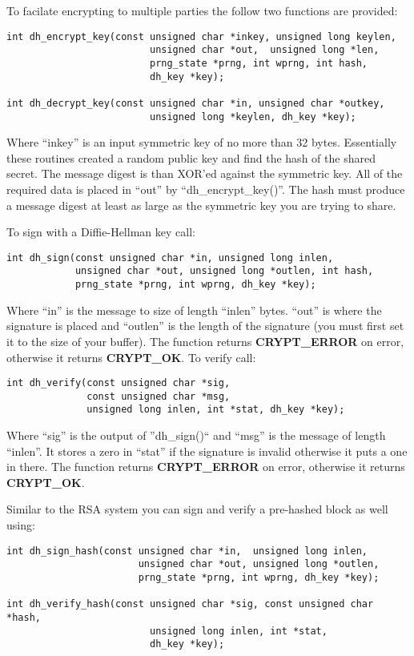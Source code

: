 \documentclass{book}
\begin{document}
To facilate encrypting to multiple parties the follow two functions are provided:
\begin{verbatim}
int dh_encrypt_key(const unsigned char *inkey, unsigned long keylen,
                         unsigned char *out,  unsigned long *len, 
                         prng_state *prng, int wprng, int hash, 
                         dh_key *key);

int dh_decrypt_key(const unsigned char *in, unsigned char *outkey, 
                         unsigned long *keylen, dh_key *key);
\end{verbatim}
Where ``inkey'' is an input symmetric key of no more than 32 bytes.  Essentially these routines created a random public key
and find the hash of the shared secret.  The message digest is than XOR'ed against the symmetric key.  All of the required
data is placed in ``out'' by ``dh\_encrypt\_key()''.   The hash must produce a message digest at least as large
as the symmetric key you are trying to share.

To sign with a Diffie-Hellman key call:
\begin{verbatim}
int dh_sign(const unsigned char *in, unsigned long inlen, 
            unsigned char *out, unsigned long *outlen, int hash, 
            prng_state *prng, int wprng, dh_key *key);
\end{verbatim}
Where ``in'' is the message to size of length ``inlen'' bytes.  ``out'' is where the signature is placed and ``outlen''
is the length of the signature (you must first set it to the size of your buffer).  The function returns {\bf CRYPT\_ERROR} on error, otherwise
it returns {\bf CRYPT\_OK}.  To verify call:
\begin{verbatim}
int dh_verify(const unsigned char *sig, 
              const unsigned char *msg, 
              unsigned long inlen, int *stat, dh_key *key);
\end{verbatim}
Where ``sig'' is the output of ''dh\_sign()`` and ``msg'' is the message of length ``inlen''.  It stores a zero in ``stat''
if the signature is invalid otherwise it puts a one in there.  The function returns {\bf CRYPT\_ERROR} on error, otherwise
it returns {\bf CRYPT\_OK}.

Similar to the RSA system you can sign and verify a pre-hashed block as well using:
\begin{verbatim}
int dh_sign_hash(const unsigned char *in,  unsigned long inlen,
                       unsigned char *out, unsigned long *outlen,
                       prng_state *prng, int wprng, dh_key *key);

int dh_verify_hash(const unsigned char *sig, const unsigned char *hash, 
                         unsigned long inlen, int *stat, 
                         dh_key *key);
\end{verbatim}
\end{document}
